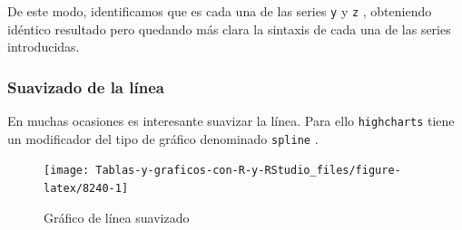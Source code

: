 \documentclass[
]{book}
\newenvironment{Shaded}{\begin{snugshade}}{\end{snugshade}}
\newcommand{\AttributeTok}[1]{\textcolor[rgb]{0.77,0.63,0.00}{#1}}
\newcommand{\ConstantTok}[1]{\textcolor[rgb]{0.00,0.00,0.00}{#1}}
\newcommand{\FunctionTok}[1]{\textcolor[rgb]{0.00,0.00,0.00}{#1}}
\newcommand{\NormalTok}[1]{#1}
\newcommand{\SpecialCharTok}[1]{\textcolor[rgb]{0.00,0.00,0.00}{#1}}
\newcommand{\StringTok}[1]{\textcolor[rgb]{0.31,0.60,0.02}{#1}}
\begin{document}
De este modo, identificamos que es cada una de las series \texttt{y} y \texttt{z} , obteniendo idéntico resultado pero quedando más clara la sintaxis de cada una de las series introducidas.

\hypertarget{suavizado-de-la-luxednea}{%
\subsubsection{Suavizado de la línea}\label{suavizado-de-la-luxednea}}

En muchas ocasiones es interesante suavizar la línea. Para ello \texttt{highcharts} tiene un modificador del tipo de gráfico denominado \texttt{spline} .

\begin{Shaded}
\end{Shaded}

\begin{figure}[H]

{\centering \texttt{[image: Tablas-y-graficos-con-R-y-RStudio\_files/figure-latex/8240-1]} 

}

\caption{Gráfico de línea suavizado}\label{fig:8240}
\end{figure}
\end{document}

